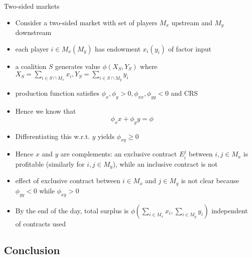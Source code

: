 \documentclass[11pt,english]{beamer}
\begin{document}
\begin{frame}[allowframebreaks]{Two-sided markets}
  \begin{itemize}
  \item Consider a two-sided market with set of players $M_x$ upstream
    and $M_y$ downstream
  \item each player $i \in M_x (M_y)$ has endowment $x_i(y_i)$ of
    factor input
  \item a coalition $S$ generates value $\phi(X_S,Y_S)$ where $X_S =
    \sum_{i \in S \cap M_x} x_i, Y_S =\sum_{i \in S \cap M_y} y_i$
  \item production function satisfies
    $\phi_x,\phi_y>0,\phi_{xx},\phi_{yy} <0$ and CRS
  \item Hence we know that
    \begin{equation*}
      \phi_x x+\phi_y y = \phi
    \end{equation*}
  \item Differentiating this w.r.t. $y$ yields $\phi_{xy} \geq 0$
  \item Hence $x$ and $y$ are complements: an exclusive contract $E_i^j$
    between $i,j \in M_x$ is profitable (similarly for $i,j \in M_y$),
    while an inclusive contract is not
  \item effect of exclusive contract between $i \in M_x$ and $j \in
    M_y$ is not clear because $\phi_{yy}<0$ while $\phi_{xy} >0$
  \item By the end of the day, total surplus is $\phi(\sum_{i\in M_x}
    x_i,\sum_{i \in M_y} y_i)$ independent of contracts used
  \end{itemize}
\end{frame}


\subsection{Conclusion}
\end{document}
